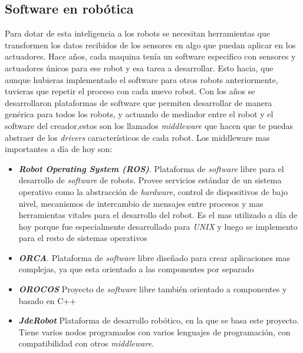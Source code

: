 \subsection{Software en robótica}
\label{subsec:softwarerobot}
Para dotar de esta inteligencia a los robots se necesitan herramientas que transformen los datos recibidos de los sensores en algo que puedan aplicar en los actuadores. Hace años, cada maquina tenía un software especifico con sensores y actuadores únicos para ese robot y esa tarea a desarrollar. Esto hacia, que aunque hubieras implementado el software para otros robots anteriormente, tuvieras que repetir el proceso con cada nuevo robot. Con los años se desarrollaron plataformas de software que permiten desarrollar de manera genérica para todos los robots, y actuando de mediador entre el robot y el software del creador,estos son los llamados \textit{middleware} que hacen que te puedas abstraer de los \textit{drivers} característicos de cada robot. Los middleware mas importantes a día de hoy son:
\begin{itemize}
    \item \textit{\textbf{Robot Operating System (ROS)}}\cite{bib:ros}. Plataforma de \textit{software} libre para el desarrollo de \textit{software} de robots. Provee servicios estándar de un sistema operativo como la abstracción de \textit{hardware}, control de dispositivos de bajo nivel, mecanismos de intercambio de mensajes entre procesos y mas herramientas vitales para el desarrollo del robot. Es el mas utilizado a día de hoy porque fue especialmente desarrollado para \textit{UNIX} y luego se implemento para el resto de sistemas operativos
    \item \textit{\textbf{ORCA}}\cite{bib:orca}. Plataforma de \textit{software} libre diseñado para crear aplicaciones mas complejas, ya que esta orientado a las componentes por separado
     \item \textit{\textbf{OROCOS}}\cite{bib:orocos} Proyecto de \textit{software} libre también orientado a componentes y basado en C++
      \item \textit{\textbf{JdeRobot}}\cite{bib:jderobot} Plataforma de desarrollo robótico, en la que se basa este proyecto. Tiene varios nodos programados  con varios lenguajes de programación, con compatibilidad con otros \textit{middleware}.
\end{itemize}{}

